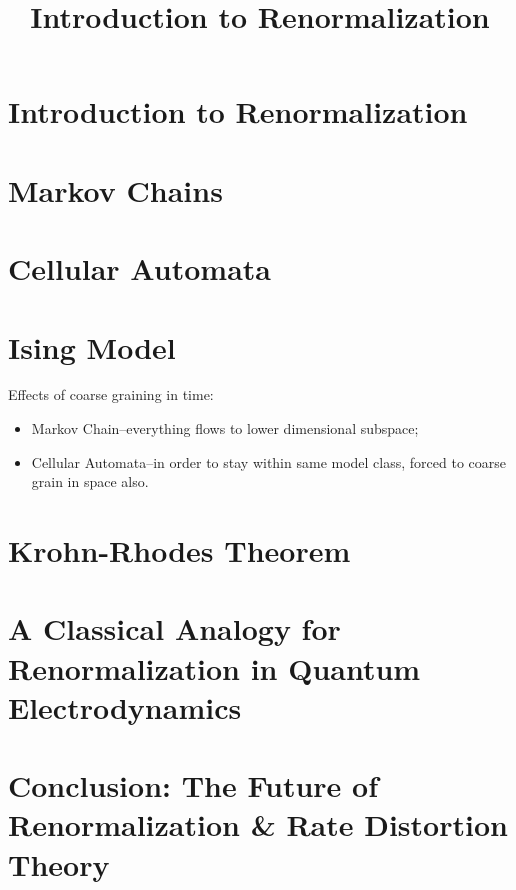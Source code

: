 \documentclass[]{article}
\title{Introduction to Renormalization}
\author{}
\begin{document}
\maketitle

\begin{abstract}

\end{abstract}
\tableofcontents
\section{Introduction to Renormalization}

\cite{dedeo2018information,dedeo2013bootstrap,dedeo201716}

\section{Markov Chains}

\cite{dedeo2016conflict}

\section{Cellular Automata}

\cite{israeli2004computational,israeli2006coarse,dedeo2018origin}
\section{Ising Model}
Effects of coarse graining in time:
\begin{itemize}
	\item Markov Chain--everything flows to lower dimensional subspace;
	\item Cellular Automata--in order to stay within same model class, forced to coarse grain in space also.
\end{itemize}

\cite{kadanoff2000statistical,dedeo2012dynamics}

\section{Krohn-Rhodes Theorem}
\section{A Classical Analogy for Renormalization in Quantum Electrodynamics}
\section{Conclusion: The Future of Renormalization \& Rate Distortion Theory}




\end{document}
